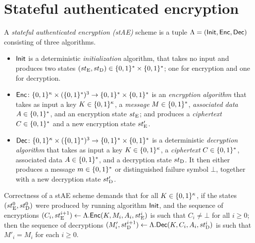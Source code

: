 \section{Stateful authenticated encryption}\label{sec:other_definitions:stAE}


A \emph{stateful authenticated encryption (stAE)} scheme is a tuple $\Lambda = (\mathsf{Init},\mathsf{Enc},\mathsf{Dec})$ consisting of three algorithms.

\begin{itemize}
	\item $\mathsf{Init}$ is a deterministic \emph{initialization} algorithm,
	that takes no input and produces two states $(st_{\mathrm{E}}, st_{\mathrm{D}}) \in \lbrace 0, 1 \rbrace^* \times \lbrace 0, 1 \rbrace^*$;
	one for encryption and one for decryption.
	
	\item  $\mathsf{Enc} \colon \lbrace 0, 1 \rbrace^{\kappa} \times (\lbrace 0, 1 \rbrace^*)^3  \to \lbrace 0, 1 \rbrace^* \times \lbrace 0, 1 \rbrace^*$ is an \emph{encryption algorithm} that takes as input a key $K \in \lbrace 0, 1 \rbrace^\kappa$, a \emph{message} $M \in \lbrace 0, 1 \rbrace^*$,
	\emph{associated data} $A \in \lbrace 0, 1 \rbrace^*$,
	 and an encryption state $st_{\mathrm{E}}$; and produces a \emph{ciphertext} $C \in \lbrace 0, 1 \rbrace^*$ and a new encryption state $st_{\mathrm{E}}'$.
	
	\item $\mathsf{Dec} \colon \lbrace 0, 1 \rbrace^{\kappa} \times (\lbrace 0, 1 \rbrace^*)^3 \to \lbrace 0, 1 \rbrace^* \times \lbrace 0, 1 \rbrace^*$ is a deterministic
	\emph{decryption algorithm} that takes as input a key $K \in \lbrace 0, 1 \rbrace^\kappa$,
	a \emph{ciphertext} $C \in \lbrace 0, 1 \rbrace^*$,
	associated data $A \in \lbrace 0, 1 \rbrace^*$,
	and a decryption state $st_{\mathrm{D}}$.
	It then either produces a message $m \in \lbrace 0, 1 \rbrace^*$ or distinguished failure symbol $\bot$,
	together with a new decryption state $st_{\mathrm{D}}'$.

\end{itemize}





Correctness of a stAE scheme demands that for all $K \in \lbrace 0, 1 \rbrace^\kappa$, 
if the states $(st_{\mathrm{E}}^0, st_{\mathrm{D}}^0)$ were produced by running algorithm $\mathsf{Init}$,
and the sequence of encryptions  $(C_i, st_{\mathrm{E}}^{i+1}) \gets \Lambda.\mathsf{Enc}(\allowbreak K,\allowbreak M_i, A_i, st_{\mathrm{E}}^i)$
is such that $C_i \neq \bot$ for all $i \geq 0$;
then the sequence of decryptions 
$(M'_i, st_{\mathrm{D}}^{i+1}) \gets \Lambda.\mathsf{Dec}(K, C_i, A_i, st_{\mathrm{D}}^i)$
is such that $M'_i = M_i$ for each $i \geq 0$.


